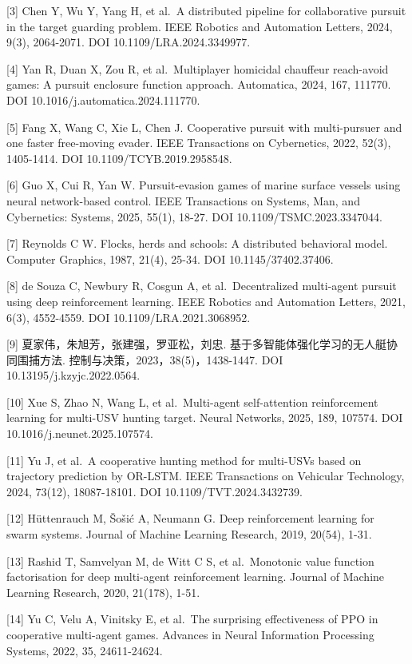 \documentclass[UTF8,a4paper,zihao=5,fontset=none]{ctexart}
\begin{document}
{[}3{]} Chen Y, Wu Y, Yang H, et al.~A distributed pipeline for collaborative pursuit in the target guarding problem. IEEE Robotics and Automation Letters, 2024, 9(3), 2064-2071. DOI 10.1109/LRA.2024.3349977.

{[}4{]} Yan R, Duan X, Zou R, et al.~Multiplayer homicidal chauffeur reach-avoid games: A pursuit enclosure function approach. Automatica, 2024, 167, 111770. DOI 10.1016/j.automatica.2024.111770.

{[}5{]} Fang X, Wang C, Xie L, Chen J. Cooperative pursuit with multi-pursuer and one faster free-moving evader. IEEE Transactions on Cybernetics, 2022, 52(3), 1405-1414. DOI 10.1109/TCYB.2019.2958548.

{[}6{]} Guo X, Cui R, Yan W. Pursuit-evasion games of marine surface vessels using neural network-based control. IEEE Transactions on Systems, Man, and Cybernetics: Systems, 2025, 55(1), 18-27. DOI 10.1109/TSMC.2023.3347044.

{[}7{]} Reynolds C W. Flocks, herds and schools: A distributed behavioral model. Computer Graphics, 1987, 21(4), 25-34. DOI 10.1145/37402.37406.

{[}8{]} de Souza C, Newbury R, Cosgun A, et al.~Decentralized multi-agent pursuit using deep reinforcement learning. IEEE Robotics and Automation Letters, 2021, 6(3), 4552-4559. DOI 10.1109/LRA.2021.3068952.

{[}9{]} 夏家伟，朱旭芳，张建强，罗亚松，刘忠. 基于多智能体强化学习的无人艇协同围捕方法. 控制与决策，2023，38(5)，1438-1447. DOI 10.13195/j.kzyjc.2022.0564.

{[}10{]} Xue S, Zhao N, Wang L, et al.~Multi-agent self-attention reinforcement learning for multi-USV hunting target. Neural Networks, 2025, 189, 107574. DOI 10.1016/j.neunet.2025.107574.

{[}11{]} Yu J, et al.~A cooperative hunting method for multi-USVs based on trajectory prediction by OR-LSTM. IEEE Transactions on Vehicular Technology, 2024, 73(12), 18087-18101. DOI 10.1109/TVT.2024.3432739.

{[}12{]} Hüttenrauch M, Šošić A, Neumann G. Deep reinforcement learning for swarm systems. Journal of Machine Learning Research, 2019, 20(54), 1-31.

{[}13{]} Rashid T, Samvelyan M, de Witt C S, et al.~Monotonic value function factorisation for deep multi-agent reinforcement learning. Journal of Machine Learning Research, 2020, 21(178), 1-51.

{[}14{]} Yu C, Velu A, Vinitsky E, et al.~The surprising effectiveness of PPO in cooperative multi-agent games. Advances in Neural Information Processing Systems, 2022, 35, 24611-24624.
\end{document}
